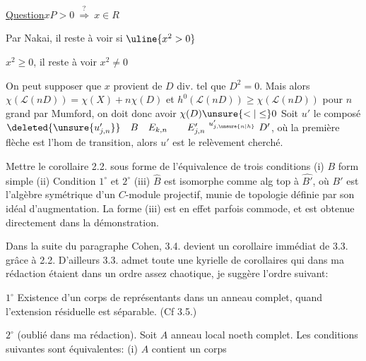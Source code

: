\uline{Question}\quad $xP>0\ \overset{?}{\Longrightarrow}\ x\in R$

Par Nakai, il reste à voir si $\uline{x^2>0}$

 $x^2\geq0$, il reste à voir $x^2\neq0$

On peut supposer que $x$ provient de $D$ div. tel que $D^2=0$. Mais alors $\chi(\mathcal L(nD))=\chi(X)+n\chi(D)$ et $h^0(\mathcal L(nD))\geq\chi(\mathcal L(nD))$ pour $n$ grand par Mumford, on doit donc avoir $\chi(D)\unsure{<|\leq}0$
Soit $u'$ le composé $\deleted{\unsure{u'_{j,n}}}\quad B\quad E_{k,n}\qquad E'_{j,n}\ {\vphantom{E'}}^{u'_{j,\unsure{n|h}}}\ D'$, où la première flèche est l'hom de transition, alors $u'$ est le relèvement cherché.

Mettre le corollaire 2.2. sous forme de l'équivalence de trois conditions (i) $B$ form simple (ii) Condition $1^\circ$ et $2^\circ$ (iii) $\widehat B$ est isomorphe comme alg top à $\widehat {B'}$, où $B'$ est l'algèbre symétrique d'un $C$-module projectif, munie de  topologie définie par son idéal d'augmentation. La forme (iii) est en effet parfois commode, et est obtenue directement dans la démonstration.

Dans la suite du paragraphe Cohen, 3.4. devient un corollaire immédiat de 3.3. grâce à 2.2. D'ailleurs 3.3. admet toute une kyrielle de corollaires qui dans ma rédaction étaient dans un ordre assez chaotique, je suggère  l'ordre suivant:

$1^\circ$ Existence d'un corps de représentants dans un anneau  complet, quand l'extension résiduelle est séparable. (Cf 3.5.)

$2^\circ$ (oublié dans ma rédaction). Soit $A$ anneau local noeth complet. Les conditions suivantes sont équivalentes: (i) $A$ contient un corps

